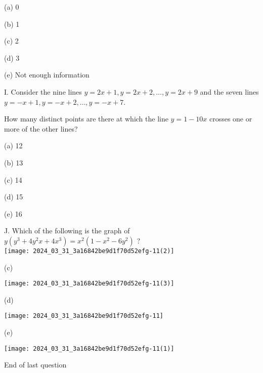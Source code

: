 \documentclass[10pt]{article}
\begin{document}
(a) 0

(b) 1

(c) 2

(d) 3

(e) Not enough information

I. Consider the nine lines $y=2 x+1, y=2 x+2, \ldots, y=2 x+9$ and the seven lines $y=-x+1, y=-x+2, \ldots, y=-x+7$.

How many distinct points are there at which the line $y=1-10 x$ crosses one or more of the other lines?

(a) 12

(b) 13

(c) 14

(d) 15

(e) 16

J. Which of the following is the graph of $y\left(y^{3}+4 y^{2} x+4 x^{3}\right)=x^{2}\left(1-x^{2}-6 y^{2}\right)$ ?\\
\texttt{[image: 2024\_03\_31\_3a16842be9d1f70d52efg-11(2)]}

(c)

\begin{center}
\texttt{[image: 2024\_03\_31\_3a16842be9d1f70d52efg-11(3)]}
\end{center}

(d)

\begin{center}
\texttt{[image: 2024\_03\_31\_3a16842be9d1f70d52efg-11]}
\end{center}

(e)

\begin{center}
\texttt{[image: 2024\_03\_31\_3a16842be9d1f70d52efg-11(1)]}
\end{center}

End of last question
\end{document}
